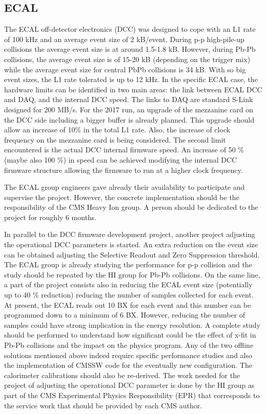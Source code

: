 \subsection{ECAL\label{subsec:ECAL}} 
The ECAL off-detector electronics (DCC) was designed to cope with an L1 rate of 100 kHz and an average event size of 2 kB/event. During p-p high-pile-up collisions the average event size is at around 1.5-1.8 kB. However, during Pb-Pb collisions, the average event size is of 15-20 kB (depending on the trigger mix) while the average event size for central PbPb collisions is 34 kB. With so big event sizes, the L1 rate tolerated is up to 12 kHz. In the specific ECAL case, the hardware limits can be identified in two main areas: the link between ECAL DCC and DAQ, and the internal DCC speed. The links to DAQ are standard S-Link designed for 200 MB/s. For the 2017 run, an upgrade of the mezzanine card on the DCC
side including a bigger buffer is already planned. This upgrade should allow an increase of 10\% in the total L1 rate. Also, the increase of clock frequency on the mezzanine card is being considered. The second limit encountered is the actual DCC internal firmware speed. An increase of 50 \% (maybe also 100 \%) in speed can be achieved modifying the internal DCC firmware structure allowing the firmware to run at a higher clock frequency. 

The ECAL group engineers gave already their availability to participate and supervise the project. However, the concrete implementation should be the responsibility of the CMS Heavy Ion group. A person should be dedicated to the project for roughly 6 months. 

In parallel to the DCC firmware development project, another project adjusting the operational DCC parameters is started. An extra reduction on the event size can be obtained adjusting the Selective Readout and Zero Suppression threshold. The ECAL group is already studying the performance for p-p collision and the study should be repeated by the HI group for Pb-Pb collisions. On the same line, a part of the project consists also in reducing the ECAL event size (potentially up to 40 \% reduction) reducing the number of samples collected for each event. At present, the ECAL reads out 10 BX for each event
and this number can be programmed down to a minimum of 6 BX. However, reducing the number of samples could have strong implication in the energy resolution. A complete study should be performed to understand how significant could be the effect of x-fit in Pb-Pb collisions and the impact on the physics program. Any of the two offline solutions mentioned above indeed require specific performance studies and also the implementation of CMSSW code for the eventually new configuration. The calorimeter calibrations should also be re-derived. The work needed for the project of adjusting the operational DCC parameter is done by the HI group as part of the CMS Experimental Physics Responsibility (EPR) that corresponds to the service work that should be provided by each CMS author.  




